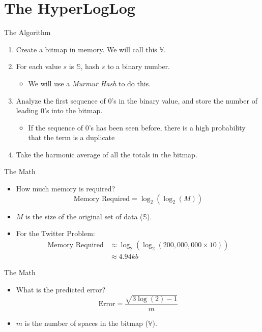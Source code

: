 \documentclass{beamer}
\begin{document}
\section{The HyperLogLog}
\begin{frame}{The Algorithm}
\begin{enumerate}
\item Create a bitmap in memory. We will call this $\mathbb{V}$.
\pause
\item For each value $s$ is $\mathbb{S}$, hash $s$ to a binary number.
\pause
\begin{itemize}
\item We will use a \textit{Murmur Hash} to do this.
\end{itemize}
\pause
\item Analyze the first sequence of 0's in the binary value, and store the number of leading 0's into the bitmap.
\begin{itemize}
\item If the sequence of 0's has been seen before, there is a high probability that the term is a duplicate
\end{itemize}
\pause
\item Take the harmonic average of all the totals in the bitmap.
\end{enumerate}
\end{frame}

\begin{frame}{The Math}
\begin{itemize}
\item How much memory is required?
\pause
\[
\text{Memory Required} = \log_{2}{(\log_{2}{(M)})}
\]
\pause
\item $M$ is the size of the original set of data ($\mathbb{S}$).
\pause
\item For the Twitter Problem:
\pause
\begin{align*}
\text{Memory Required} &\approx \log_{2}{(\log_{2}{(200,000,000 \times 10)})}\\
&\approx 4.94 kb
\end{align*}
\end{itemize}
\end{frame}

\begin{frame}{The Math}
\begin{itemize}
\item What is the predicted error?
\pause
\[
\text{Error} = \frac{\sqrt{3\log{(2)} - 1}}{m}
\]
\pause
\item $m$ is the number of spaces in the bitmap ($\mathbb{V}$).
\end{itemize}
\end{frame}
\end{document}
